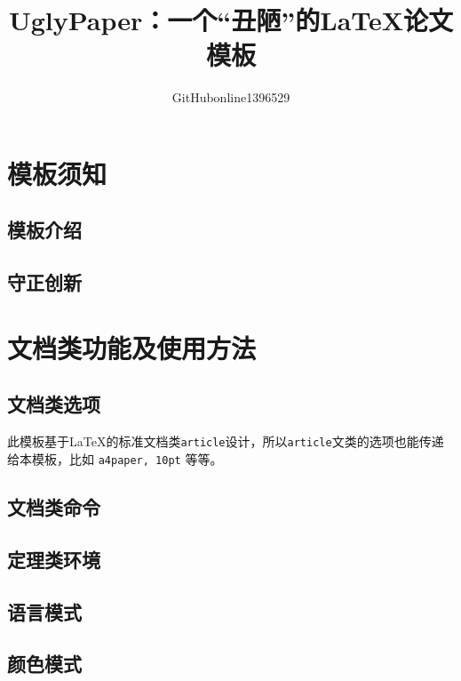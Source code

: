 \documentclass[10pt, twocolumn, compact, crimson]{uglypaper}
\title{\bfseries UglyPaper：一个“丑陋”的\LaTeX{}论文模板}
\author{GitHubonline1396529}
\date{\zhdate{2022/12/31}}
\begin{document}

\section{模板须知}
\subsection{模板介绍}


\subsection{守正创新}


\section{文档类功能及使用方法}
\subsection{文档类选项}\label{ssec:classoptions}

此模板基于\LaTeX{}的标准文档类\texttt{article}设计，所以\texttt{article}文类的选项也能传递给本模板，比如 \texttt{a4paper, 10pt} 等等。



\subsection{文档类命令}


\subsection{定理类环境}


\subsection{语言模式}


\subsection{颜色模式}\label{ssec:colors}

\end{document}

